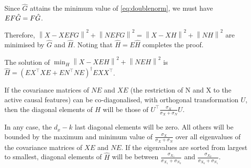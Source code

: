 \documentclass{article}
\begin{document}
Since $\hat G$ attains the minimum value of \ref{eq:doublenorm}, we must have $EF\hat G = F\Hat G$.

Therefore, $\left \| X - XEFG\right \| ^2  + \left \| NEFG\right \| ^2 = \left \| X - XH\right \| ^2  + \left \| NH\right \| ^2$ are minimised by $\hat G$ and $\hat H$. Noting that $\hat H = E\hat H$ completes the proof.

The solution of $\min_H  \left \| X - XEH\right\| ^2  + \left \| NEH\right \| ^2$ is $\hat H= (E X^\top XE +EN^\top NE) ^\dagger EXX^\top$. 

If the covariance matrices of $NE$ and $XE$ (the restriction of N and X to the active causal features) can be co-diagonalised, with orthogonal transformation $U$, then the diagonal elements of $\hat H$ will be those of $U^\top  \frac{\sigma_X}{\sigma_X + \sigma_N} U $. 

In any case, the $d_x-k$ last diagonal elements will be zero. All others will be bounded by the maximum and minimum value of $\frac{\sigma_X}{\sigma_X + \sigma_N}$ over all eigenvalues of the covariance matrices of $XE$ and $NE$. If the eigenvalues are sorted from largest to smallest, diagonal elements of $\hat H$ will be between $\frac{\sigma_{X_1}}{\sigma_{X_1} +\sigma_{N_k}}$ and $\frac{\sigma_{X_k}}{\sigma_{X_k} +\sigma_{N_1}}$.
\end{document}
